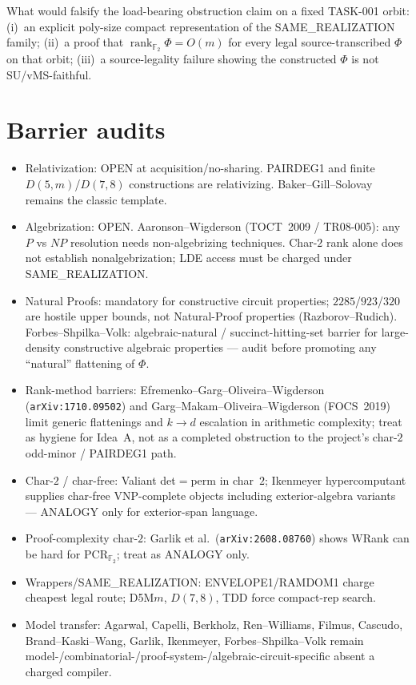 \documentclass[11pt]{article}
\begin{document}
What would falsify the load-bearing obstruction claim on a fixed TASK-001 orbit:
(i)~an explicit poly-size compact representation of the SAME\_REALIZATION family;
(ii)~a proof that $\operatorname{rank}_{\mathbb F_2}\Phi=O(m)$ for every legal
source-transcribed $\Phi$ on that orbit; (iii)~a source-legality failure showing
the constructed $\Phi$ is not SU/vMS-faithful.

\section*{Barrier audits}
\begin{itemize}
\item Relativization: OPEN at acquisition/no-sharing. PAIRDEG1 and finite
$D(5,m)$/$D(7,8)$ constructions are relativizing. Baker--Gill--Solovay remains
the classic template.
\item Algebrization: OPEN. Aaronson--Wigderson (TOCT~2009 / TR08-005): any
$P$ vs $NP$ resolution needs non-algebrizing techniques. Char-$2$ rank alone does
not establish nonalgebrization; LDE access must be charged under SAME\_REALIZATION.
\item Natural Proofs: mandatory for constructive circuit properties; $2285$/$923$/$320$
are hostile upper bounds, not Natural-Proof properties (Razborov--Rudich).
Forbes--Shpilka--Volk: algebraic-natural / succinct-hitting-set barrier for
large-density constructive algebraic properties --- audit before promoting any
``natural'' flattening of $\Phi$.
\item Rank-method barriers: Efremenko--Garg--Oliveira--Wigderson
(\texttt{arXiv:1710.09502}) and Garg--Makam--Oliveira--Wigderson (FOCS~2019)
limit generic flattenings and $k\to d$ escalation in arithmetic complexity;
treat as hygiene for Idea~A, not as a completed obstruction to the project's
char-$2$ odd-minor / PAIRDEG1 path.
\item Char-$2$ / char-free: Valiant det$=$perm in char~$2$; Ikenmeyer
hypercomputant supplies char-free VNP-complete objects including exterior-algebra
variants --- ANALOGY only for exterior-span language.
\item Proof-complexity char-$2$: Garlik et al.\ (\texttt{arXiv:2608.08760}) shows
WRank can be hard for PCR$_{\mathbb F_2}$; treat as ANALOGY only.
\item Wrappers/SAME\_REALIZATION: ENVELOPE1/RAMDOM1 charge cheapest legal route;
D5M$m$, $D(7,8)$, TDD force compact-rep search.
\item Model transfer: Agarwal, Capelli, Berkholz, Ren--Williams, Filmus,
Cascudo, Brand--Kaski--Wang, Garlik, Ikenmeyer, Forbes--Shpilka--Volk remain
model-/combinatorial-/proof-system-/algebraic-circuit-specific absent a charged
compiler.
\end{itemize}
\end{document}
